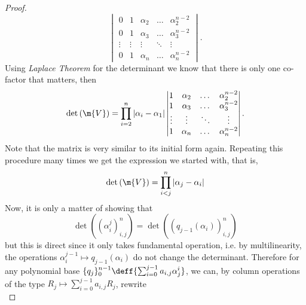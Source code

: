 \begin{proof}
\begin{equation}
\begin{vmatrix}
	0 & 1 & \alpha_2 & \dots & \alpha_2^{n-2} \\
	0 & 1 & \alpha_3 & \dots & \alpha_3^{n-2} \\
	\vdots & \vdots & \vdots & \ddots & \vdots \\
	0 & 1 & \alpha_n & \dots & \alpha_n^{n-2}
\end{vmatrix}.
\end{equation}
Using \textit{Laplace Theorem} for the determinant we know that there is only one co-factor that matters, then
\begin{equation}
	\det\left(\m{V}\right) =
	\prod_{i=2}^n |\alpha_i - \alpha_1|
	\begin{vmatrix}
		1 & \alpha_2 & \dots & \alpha_2^{n-2} \\
		1 & \alpha_3 & \dots & \alpha_3^{n-2} \\
		\vdots & \vdots & \ddots & \vdots \\
		1 & \alpha_n & \dots & \alpha_n^{n-2}
	\end{vmatrix}.
\end{equation}
Note that the matrix is very similar to its initial form again. Repeating this procedure many times we get the expression we started with, that is,
\begin{equation}
\det\left(\m{V}\right) = \prod_{i<j}^n |\alpha_j - \alpha_i|
\end{equation}
Now, it is only a matter of showing that
\begin{equation}
	\det\left( (\alpha_i^j)_{i,j}^n \right) = \det\left( (q_{j-1}(\alpha_i))_{i,j}^n \right)
\end{equation}
but this is direct since it only takes fundamental operation, i.e. by multilinearity, the operations $\alpha_i^{j-1} \mapsto q_{j-1}(\alpha_i)$ do not change the determinant. Therefore for any polynomial base $\{q_{j}\}_0^{n-1} \deff \{\sum_{i=0}^{j-1} a_{i,j} \alpha_j^i\}$, we can, by column operations of the type $R_j \mapsto \sum_{i=0}^{j-1} a_{i,j} R_j$, rewrite
\begin{equation}

\end{equation}
\end{proof}
